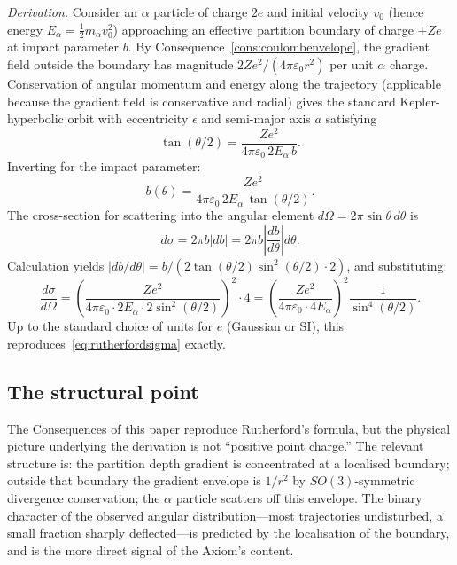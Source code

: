 \documentclass[11pt,twocolumn,a4paper]{article}
\theoremstyle{axiomstyle}
\theoremstyle{conseqstyle}
\theoremstyle{definition}
\theoremstyle{remark}
\begin{document}
\emph{Derivation.} Consider an $\alpha$ particle of charge $2e$ and initial velocity $v_{0}$ (hence energy $E_{\alpha}=\tfrac{1}{2}m_{\alpha}v_{0}^{2}$) approaching an effective partition boundary of charge $+Ze$ at impact parameter $b$. By Consequence~\ref{cons:coulombenvelope}, the gradient field outside the boundary has magnitude $2Ze^{2}/(4\pi\varepsilon_{0}r^{2})$ per unit $\alpha$ charge. Conservation of angular momentum and energy along the trajectory (applicable because the gradient field is conservative and radial) gives the standard Kepler-hyperbolic orbit with eccentricity $\epsilon$ and semi-major axis $a$ satisfying
\begin{equation*}
\tan(\theta/2)=\frac{Ze^{2}}{4\pi\varepsilon_{0}\,2E_{\alpha}\,b}.
\end{equation*}
Inverting for the impact parameter:
\begin{equation*}
b(\theta)=\frac{Ze^{2}}{4\pi\varepsilon_{0}\,2E_{\alpha}\,\tan(\theta/2)}.
\end{equation*}
The cross-section for scattering into the angular element $d\Omega=2\pi\sin\theta\,d\theta$ is
\begin{equation*}
d\sigma=2\pi b|db|=2\pi b\left|\frac{db}{d\theta}\right|d\theta.
\end{equation*}
Calculation yields $|db/d\theta|=b/(2\tan(\theta/2)\sin^{2}(\theta/2)\cdot 2)$, and substituting:
\begin{equation*}
\frac{d\sigma}{d\Omega}=\left(\frac{Ze^{2}}{4\pi\varepsilon_{0}\cdot 2E_{\alpha}\cdot 2\sin^{2}(\theta/2)}\right)^{2}\cdot 4 = \left(\frac{Ze^{2}}{4\pi\varepsilon_{0}\cdot 4E_{\alpha}}\right)^{2}\frac{1}{\sin^{4}(\theta/2)}.
\end{equation*}
Up to the standard choice of units for $e$ (Gaussian or SI), this reproduces~\eqref{eq:rutherfordsigma} exactly.

\subsection{The structural point}

The Consequences of this paper reproduce Rutherford's formula, but the physical picture underlying the derivation is not ``positive point charge.'' The relevant structure is: the partition depth gradient is concentrated at a localised boundary; outside that boundary the gradient envelope is $1/r^{2}$ by $SO(3)$-symmetric divergence conservation; the $\alpha$ particle scatters off this envelope. The binary character of the observed angular distribution---most trajectories undisturbed, a small fraction sharply deflected---is predicted by the localisation of the boundary, and is the more direct signal of the Axiom's content.
\end{document}
